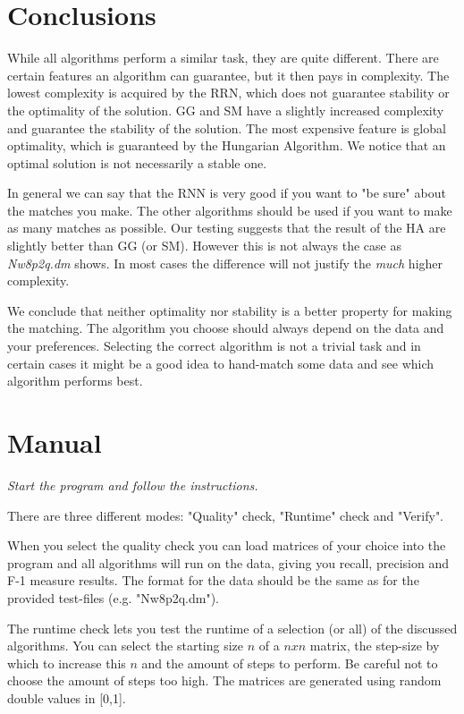 \documentclass[a4paper,11pt]{article}
\begin{document}
\section{Conclusions}

While all algorithms perform a similar task, they are quite different. There are certain features an algorithm can guarantee, but it then pays in complexity. The lowest complexity is acquired by the RRN, which does not guarantee stability or the optimality of the solution. GG and SM have a slightly increased complexity and guarantee the stability of the solution. The most expensive feature is global optimality, which is guaranteed by the Hungarian Algorithm. We notice that an optimal solution is not necessarily a stable one.

In general we can say that the RNN is very good if you want to "be sure" about the matches you make. The other algorithms should be used if you want to make as many matches as possible. Our testing suggests that the result of the HA are slightly better than GG (or SM). However this is not always the case as \textit{Nw8p2q.dm} shows. In most cases the difference will not justify the \textit{much} higher complexity. 

We conclude that neither optimality nor stability is a better property for making the matching. The algorithm you choose should always depend on the data and your preferences. Selecting the correct algorithm is not a trivial task and in certain cases it might be a good idea to hand-match some data and see which algorithm performs best.

\section{Manual}

\textit{Start the program and follow the instructions.}

There are three different modes: "Quality" check, "Runtime" check and "Verify".

When you select the quality check you can load matrices of your choice into the program and all algorithms will run on the data, giving you recall, precision and F-1 measure results. The format for the data should be the same as for the provided test-files (e.g. "Nw8p2q.dm").

The runtime check lets you test the runtime of a selection (or all) of the discussed algorithms. You can select the starting size $n$ of a $nxn$ matrix, the step-size by which to increase this $n$ and the amount of steps to perform. Be careful not to choose the amount of steps too high. The matrices are generated using random double values in [0,1].
\end{document}
